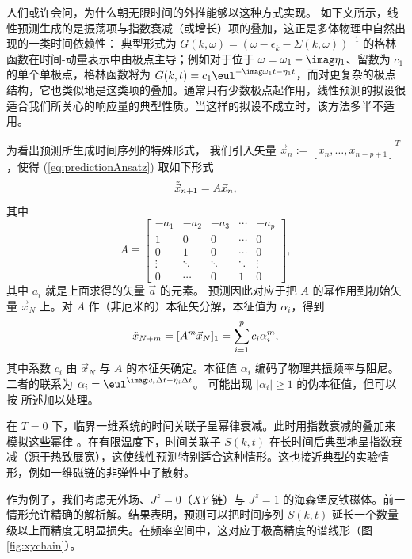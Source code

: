 人们或许会问，为什么朝无限时间的外推能够以这种方式实现。
如下文所示，线性预测生成的是振荡项与指数衰减（或增长）项的叠加，这正是多体物理中自然出现的一类时间依赖性：
典型形式为 $G(k,\omega) = (\omega - \epsilon_k - \Sigma(k,\omega))^{-1}$ 的格林函数在时间-动量表示中由极点主导；例如对于位于 $\omega=\omega_1 -\imag \eta_1$、留数为 $c_1$ 的单个单极点，格林函数将为
$G(k,t) = c_1 \eul^{-\imag \omega_1 t - \eta_1 t}$，而对更复杂的极点结构，它也类似地是这类项的叠加。通常只有少数极点起作用，线性预测的拟设很适合我们所关心的响应量的典型性质。当这样的拟设不成立时，该方法多半不适用。

为看出预测所生成时间序列的特殊形式，
我们引入矢量 $\vec{x}_n := [x_{n}, \ldots, x_{n-p+1}]^T$，使得 (\ref{eq:predictionAnsatz}) 取如下形式
\begin{equation}
\tilde{\vec{x}}_{n+1} = A \* \vec{x}_n,	
\end{equation}
 其中
\begin{equation}\label{eq:predictionMatrix}
A\equiv
\left[
\begin{array}{ccccc}
 -a_1&-a_2&-a_3&\cdots&-a_p\\
  1  & 0  & 0  &\cdots& 0  \\
  0  & 1  & 0  &\cdots& 0  \\
\vdots&\ddots&\ddots&\ddots&\vdots\\
  0   &\cdots& 0  & 1  & 0
\end{array}  
\right] ,
\end{equation}
其中 $a_i$ 就是上面求得的矢量 $\vec{a}$ 的元素。
预测因此对应于把 $A$ 的幂作用到初始矢量 $\vec{x}_N$ 上。对 $A$ 作（非厄米的）本征矢分解，本征值为 $\alpha_i$，得到
\begin{equation}
\tilde x_{N+m} = [A^m \* \vec{x}_N]_1=\sum_{i=1}^p c_i \alpha_i^m,
\end{equation}
其中系数 $c_i$ 由 $\vec{x}_N$ 与 $A$ 的本征矢确定。本征值 $\alpha_i$ 编码了物理共振频率与阻尼。二者的联系为
$\alpha_i = \eul^{\imag  \omega_i \Delta t - \eta_i \Delta t}$。
可能出现 $|\alpha_i|\geq 1$ 的伪本征值，但可以按 \cite{Barthel09b} 所述加以处理。

在 $T=0$ 下，临界一维系统的时间关联子呈幂律衰减。此时用指数衰减的叠加来模拟这些幂律 \cite{Pereira08}。在有限温度下，时间关联子 $S(k,t)$ 在长时间后典型地呈指数衰减（源于热致展宽），这使线性预测特别适合这种情形。这也接近典型的实验情形，例如一维磁链的非弹性中子散射。

作为例子，我们考虑无外场、$J^z=0$（$XY$ 链）与 $J^z=1$ 的海森堡反铁磁体。前一情形允许精确的解析解。结果表明，预测可以把时间序列 $S(k,t)$ 延长一个数量级以上而精度无明显损失。在频率空间中，这对应于极高精度的谱线形（图 \ref{fig:xychain}）。

